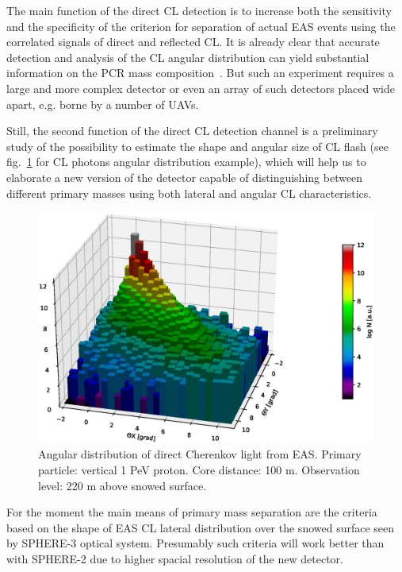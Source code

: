 \documentclass[a4paper,11pt]{article}
\begin{document}
The main function of the direct CL detection is to increase both the sensitivity and the specificity of the criterion for separation of actual EAS events using the correlated signals of direct and reflected CL. It is already clear that accurate detection and analysis of the CL angular distribution can yield substantial information on the PCR mass composition~\cite{Gal18a,Gal18b}. But such an experiment requires a large and more complex detector or even an array of such detectors placed wide apart, e.g. borne by a number of UAVs.

Still, the second function of the direct CL detection channel is a preliminary study of the possibility to estimate the shape and angular size of CL flash (see fig.~\ref{fig:CLangular} for CL photons angular distribution example), which will help us to elaborate a new version of the detector capable of distinguishing between different primary masses using both lateral and angular CL characteristics.

\begin{figure}[t]
\centering %
\includegraphics[height=.4\textheight]{ang_distr.eps}
\caption{Angular distribution of direct Cherenkov light from EAS. Primary particle: vertical 1 PeV proton. Core distance: 100 m. Observation level: 220 m above snowed surface.}
\label{fig:CLangular}
\end{figure}


For the moment the main means of primary mass separation are the criteria based on the shape of EAS CL lateral distribution over the snowed surface seen by SPHERE-3 optical system. Presumably such criteria will work better than with SPHERE-2 due to higher spacial resolution of the new detector.
\end{document}
